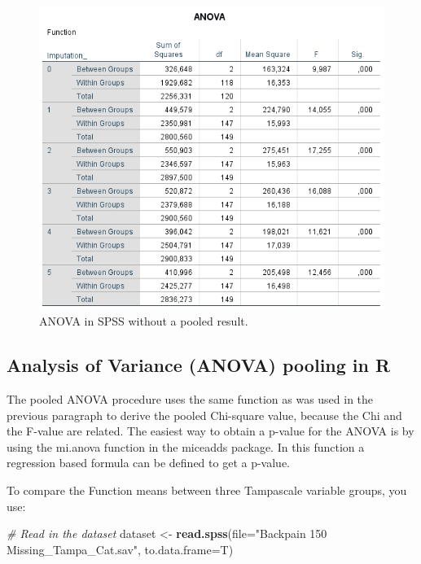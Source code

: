 \documentclass[]{book}
\newenvironment{Shaded}{\begin{snugshade}}{\end{snugshade}}
\newcommand{\KeywordTok}[1]{\textcolor[rgb]{0.13,0.29,0.53}{\textbf{#1}}}
\newcommand{\DataTypeTok}[1]{\textcolor[rgb]{0.13,0.29,0.53}{#1}}
\newcommand{\StringTok}[1]{\textcolor[rgb]{0.31,0.60,0.02}{#1}}
\newcommand{\CommentTok}[1]{\textcolor[rgb]{0.56,0.35,0.01}{\textit{#1}}}
\newcommand{\NormalTok}[1]{#1}
\theoremstyle{definition}
\theoremstyle{definition}
\theoremstyle{definition}
\theoremstyle{remark}
\begin{document}
\begin{figure}

{\centering \includegraphics[width=0.9\linewidth]{images/table5.7} 

}

\caption{ANOVA in SPSS without a pooled result.}\label{fig:tab5-7}
\end{figure}

\subsection{Analysis of Variance (ANOVA) pooling in
R}\label{analysis-of-variance-anova-pooling-in-r}

The pooled ANOVA procedure uses the same function as was used in the
previous paragraph to derive the pooled Chi-square value, because the
Chi and the F-value are related. The easiest way to obtain a p-value for
the ANOVA is by using the mi.anova function in the miceadds package. In
this function a regression based formula can be defined to get a
p-value.

To compare the Function means between three Tampascale variable groups,
you use:

\begin{Shaded}
\begin{Highlighting}[]
\CommentTok{# Read in the dataset}
\NormalTok{dataset <-}\StringTok{ }\KeywordTok{read.spss}\NormalTok{(}\DataTypeTok{file=}\StringTok{"Backpain 150 Missing_Tampa_Cat.sav"}\NormalTok{, }\DataTypeTok{to.data.frame=}\NormalTok{T)}
\end{Highlighting}
\end{Shaded}
\end{document}
